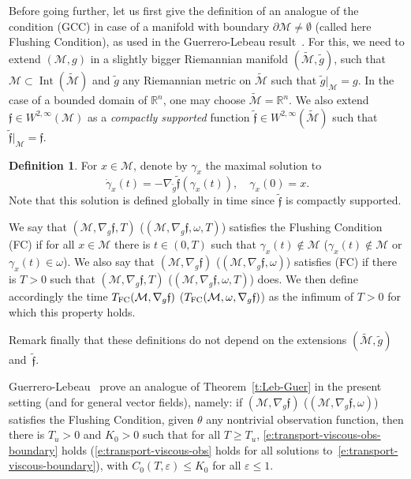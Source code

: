 \documentclass[JEP,XML,SOM,Unicode]{cedram}
\newcommand{\FC}{\textup{FC}}
\newcommand{\pFC}{\textup{(FC)}\xspace}
\newcommand{\pGCC}{\textup{(GCC)}\xspace}
\theoremstyle{definition}
\newtheorem{definition}[lemma]{Definition}
\newcommand{\M}{\ensuremath{\mathcal M}}
\newcommand{\mb}[1]{\ensuremath{\mathbb{#1}}}
\newcommand{\R}{{\mb{R}}}
\newcommand{\f}{\ensuremath{\mathfrak{f}}}
\DeclareMathOperator{\Int}{Int}
\let\d\partial
\let\eps\varepsilon
\begin{document}
Before going further, let us first give the definition of an analogue of the condition \pGCC in case of a manifold with boundary $\d\M \neq \emptyset$ (called here Flushing Condition), as used in the Guerrero-Lebeau result~\cite{GL:07}. For this, we need to extend $(\M,g)$ in a slightly bigger Riemannian manifold $(\tilde{\M}, \tilde{g})$, \ie such that $\M\subset \Int(\tilde{\M})$ and $\tilde{g}$ any Riemannian metric on $\tilde{\M}$ such that $\tilde{g}|_{\M}=g$. In the case of a bounded domain of $\R^n$, one may choose $\tilde{\M} = \R^n$. We also extend $\f \in W^{2,\infty}(\M)$ as a {\em compactly supported } function $\tilde{\f}\in W^{2,\infty}(\tilde{\M})$ such that $\tilde{\f}|_{\M} = \f$.
\begin{definition}
\label{d:def-GCC_bdry}
For $x\in \M$, denote by $\gamma_x$ the maximal solution to
\[
\dot{\gamma}_x(t) = -\nabla_{\tilde{g}}\tilde{\f}(\gamma_x(t)), \quad \gamma_x(0)=x. 
\]
Note that this solution is defined globally in time since $\tilde{\f}$ is compactly supported.

We say that $(\M,\nabla_g \f,T)$ (\resp $(\M,\nabla_g \f,\omega,T)$) satisfies the Flushing Condition \pFC if for all $x\in \M$ there is $t\in (0,T)$ such that $\gamma_x(t)\notin \M$ (\resp $\gamma_x(t)\notin \M$ or $\gamma_x(t)\in \omega$). We also say that $(\M,\nabla_g \f)$ (\resp $(\M,\nabla_g \f,\omega)$) satisfies \pFC if there is $T>0$ such that $(\M,\nabla_g \f,T)$ (\resp $(\M,\nabla_g \f,\omega,T)$) does. We then define accordingly the time $T_{\FC}(\M,\nabla_g \f)$ (\resp $T_{\FC}(\M,\omega,\nabla_g \f)$) as the infimum of $T>0$ for which this property holds.

Remark finally that these definitions do not depend on the extensions $(\tilde{\M}, \tilde{g})$ and~$\tilde{\f}$.
\end{definition}

Guerrero-Lebeau~\cite{GL:07} prove an analogue of Theorem~\ref{t:Leb-Guer} in the present setting (and for general vector fields), namely: if $(\M,\nabla_g \f)$ (\resp $(\M,\nabla_g \f,\omega)$) satisfies the Flushing Condition, given $\theta$ any nontrivial observation function, then there is $T_{u}>0$ and $K_0>0$ such that for all $T\geq T_{u}$, \eqref{e:transport-viscous-obs-boundary} holds (\resp \eqref{e:transport-viscous-obs} holds for all solutions to~\eqref{e:transport-viscous-boundary}), with $C_0(T,\eps)\leq K_0$ for all $\eps \leq 1$.
\end{document}
